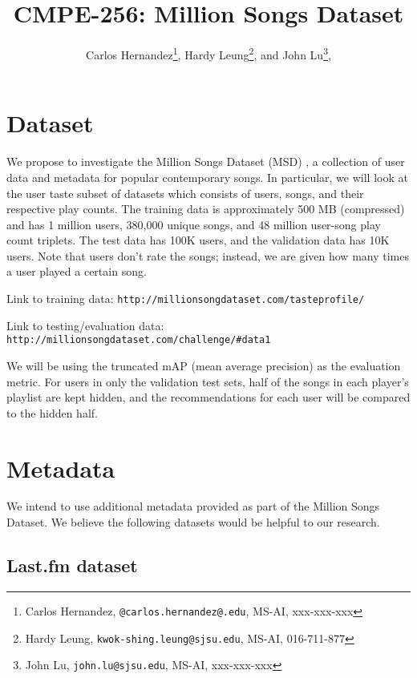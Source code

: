 \documentclass[10pt]{article}
\begin{document}
\title{\textsc{CMPE-256}: Million Songs Dataset}
\date{}

\author{
Carlos Hernandez\thanks{
Carlos Hernandez, \texttt{@carlos.hernandez@.edu},
MS-AI, xxx-xxx-xxx},
Hardy Leung\thanks{
Hardy Leung, \texttt{kwok-shing.leung@sjsu.edu}, MS-AI, 016-711-877},
and John Lu\thanks{
John Lu, \texttt{john.lu@sjsu.edu}, MS-AI, xxx-xxx-xxx},
}

\maketitle

\section{Dataset}

We propose to investigate the Million Songs Dataset (MSD) \cite{bertin2011million},
a collection of user data and metadata for popular contemporary songs. In particular, we will look at the user taste subset of datasets which consists of users, songs, and their respective play counts. The training data is approximately 500 MB (compressed) and has 1 million users, 380,000 unique songs, and 48 million user-song play count triplets. The test data has 100K users, and the validation data has 10K users. Note that users don't rate the songs; instead, we are given how many times a user played a certain song.

Link to training data: \texttt{http://millionsongdataset.com/tasteprofile/}

Link to testing/evaluation data: \texttt{http://millionsongdataset.com/challenge/\#data1}

We will be using the truncated mAP (mean average precision) as the evaluation metric. For users in only the validation test sets, half of the songs in each player's playlist are kept hidden, and the recommendations for each user will be compared to the hidden half. 

\section{Metadata}

We intend to use additional metadata provided as part of the Million Songs Dataset. We believe the following datasets would be helpful to our research.

\subsection{Last.fm dataset \cite{bertin2011million}}
\end{document}
